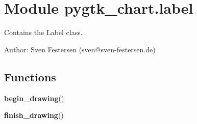 %
%
%


\section{Module pygtk\_chart.label}

    \label{pygtk_chart:label}
Contains the Label class.

Author: Sven Festersen (sven@sven-festersen.de)



  \subsection{Functions}

    \label{pygtk_chart:label:begin_drawing}

    \vspace{0.5ex}

\hspace{.8\funcindent}\begin{boxedminipage}{\funcwidth}

    \raggedright \textbf{begin\_drawing}()

\setlength{\parskip}{2ex}
\setlength{\parskip}{1ex}
    \end{boxedminipage}

    \label{pygtk_chart:label:finish_drawing}

    \vspace{0.5ex}

\hspace{.8\funcindent}\begin{boxedminipage}{\funcwidth}

    \raggedright \textbf{finish\_drawing}()

\setlength{\parskip}{2ex}
\setlength{\parskip}{1ex}
    \end{boxedminipage}

